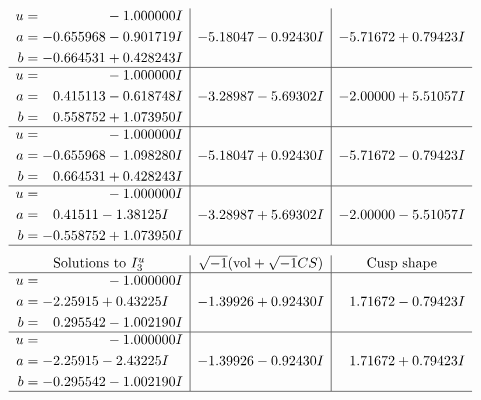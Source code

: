 \documentclass[1p]{elsarticle_modified}
\theoremstyle{definition}
\newcommand{\I}{\sqrt{-1}}
\begin{document}
$$\begin{array}{c|c|c}
\begin{aligned}
u &= \phantom{-0.000000 } -1.000000 I \\
a &= -0.655968 - 0.901719 I \\
b &= -0.664531 + 0.428243 I\end{aligned}
 & -5.18047 - 0.92430 I & -5.71672 + 0.79423 I \\ \hline\begin{aligned}
u &= \phantom{-0.000000 } -1.000000 I \\
a &= \phantom{-}0.415113 - 0.618748 I \\
b &= \phantom{-}0.558752 + 1.073950 I\end{aligned}
 & -3.28987 - 5.69302 I & -2.00000 + 5.51057 I \\ \hline\begin{aligned}
u &= \phantom{-0.000000 } -1.000000 I \\
a &= -0.655968 - 1.098280 I \\
b &= \phantom{-}0.664531 + 0.428243 I\end{aligned}
 & -5.18047 + 0.92430 I & -5.71672 - 0.79423 I \\ \hline\begin{aligned}
u &= \phantom{-0.000000 } -1.000000 I \\
a &= \phantom{-}0.41511 - 1.38125 I \\
b &= -0.558752 + 1.073950 I\end{aligned}
 & -3.28987 + 5.69302 I & -2.00000 - 5.51057 I\\
 \hline 
 \end{array}$$\newpage$$\begin{array}{c|c|c}  
\text{Solutions to }I^u_{3}& \I (\text{vol} + \sqrt{-1}CS) & \text{Cusp shape}\\
 \hline 
\begin{aligned}
u &= \phantom{-0.000000 } -1.000000 I \\
a &= -2.25915 + 0.43225 I \\
b &= \phantom{-}0.295542 - 1.002190 I\end{aligned}
 & -1.39926 + 0.92430 I & \phantom{-}1.71672 - 0.79423 I \\ \hline\begin{aligned}
u &= \phantom{-0.000000 } -1.000000 I \\
a &= -2.25915 - 2.43225 I \\
b &= -0.295542 - 1.002190 I\end{aligned}
 & -1.39926 - 0.92430 I & \phantom{-}1.71672 + 0.79423 I\\
 \hline 
 \end{array}$$\newpage\newpage\renewcommand{\arraystretch}{1}
\end{document}
